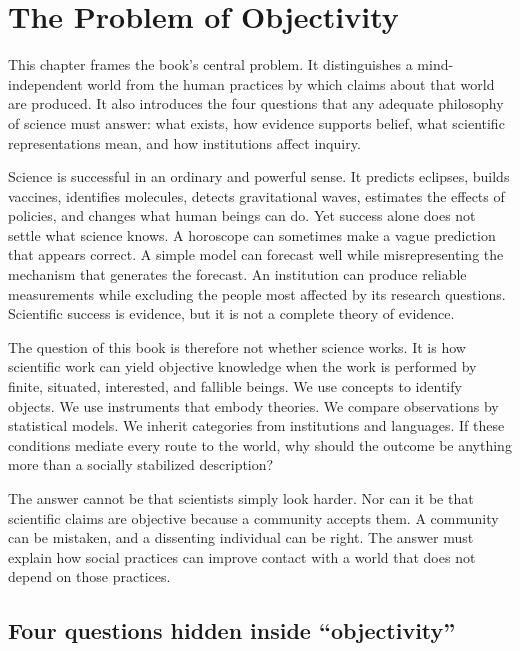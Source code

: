 \chapter{The Problem of Objectivity}
\label{ch:problem}

\begin{chapterguide}
This chapter frames the book's central problem. It distinguishes a mind-independent
world from the human practices by which claims about that world are produced.
It also introduces the four questions that any adequate philosophy of science
must answer: what exists, how evidence supports belief, what scientific
representations mean, and how institutions affect inquiry.
\end{chapterguide}

Science is successful in an ordinary and powerful sense. It predicts eclipses,
builds vaccines, identifies molecules, detects gravitational waves, estimates
the effects of policies, and changes what human beings can do. Yet success alone
does not settle what science knows. A horoscope can sometimes make a vague
prediction that appears correct. A simple model can forecast well while
misrepresenting the mechanism that generates the forecast. An institution can
produce reliable measurements while excluding the people most affected by its
research questions. Scientific success is evidence, but it is not a complete
theory of evidence.

The question of this book is therefore not whether science works. It is how
scientific work can yield objective knowledge when the work is performed by
finite, situated, interested, and fallible beings. We use concepts to identify
objects. We use instruments that embody theories. We compare observations by
statistical models. We inherit categories from institutions and languages. If
these conditions mediate every route to the world, why should the outcome be
anything more than a socially stabilized description?

The answer cannot be that scientists simply look harder. Nor can it be that
scientific claims are objective because a community accepts them. A community
can be mistaken, and a dissenting individual can be right. The answer must
explain how social practices can improve contact with a world that does not
depend on those practices.

\section{Four questions hidden inside \enquote{objectivity}}

